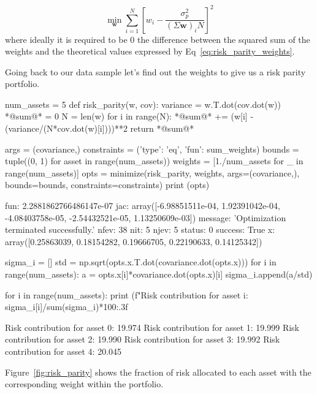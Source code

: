 \begin{equation} 
\underset{\mathbf{w}}{\min } \sum _{i=1}^{N}\left[w_{i}-{\frac {\sigma_p^{2}}{(\Sigma \mathbf{w})_{i}N}}\right]^{2} 
\end{equation}
\noindent
where ideally it is required to be 0 the difference between the squared sum of the weights and the theoretical values expressed by Eq~\ref{eq:risk_parity_weights}.

Going back to our data sample let's find out the weights to give us a risk parity portfolio.

\begin{ipython}
num_assets = 5
def risk_parity(w, cov):
    variance = w.T.dot(cov.dot(w))
    *@sum@* = 0
    N = len(w)
    for i in range(N):
        *@sum@* += (w[i] - (variance/(N*cov.dot(w)[i])))**2
    return *@sum@*
	
args = (covariance,)
constraints = ({'type': 'eq', 'fun': sum_weights})
bounds = tuple((0, 1) for asset in range(num_assets))
weights = [1./num_assets for _ in range(num_assets)]
opts = minimize(risk_parity, weights, args=(covariance,),
                bounds=bounds, constraints=constraints)
print (opts)
\end{ipython}
\begin{ioutput}
    fun: 2.2881862766486147e-07
    jac: array([-6.98851511e-04,  1.92391042e-04, -4.08403758e-05, 
                -2.54432521e-05,  1.13250609e-03])
message: 'Optimization terminated successfully.'
   nfev: 38
    nit: 5
   njev: 5
 status: 0
success: True
x: array([0.25863039, 0.18154282, 0.19666705, 0.22190633, 
          0.14125342])
\end{ioutput}

\begin{ipython}
sigma_i = []
std = np.sqrt(opts.x.T.dot(covariance.dot(opts.x)))
for i in range(num_assets):
    a = opts.x[i]*covariance.dot(opts.x)[i]
	sigma_i.append(a/std)
	
for i in range(num_assets):
    print (f"Risk contribution for asset {i}: {sigma_i[i]/sum(sigma_i)*100:.3f}%
\end{ipython}
\begin{ioutput}
Risk contribution for asset 0: 19.974%
Risk contribution for asset 1: 19.999%
Risk contribution for asset 2: 19.990%
Risk contribution for asset 3: 19.992%
Risk contribution for asset 4: 20.045%
\end{ioutput}

Figure~\ref{fig:risk_parity} shows the fraction of risk allocated to each asset with the corresponding weight within the portfolio.

